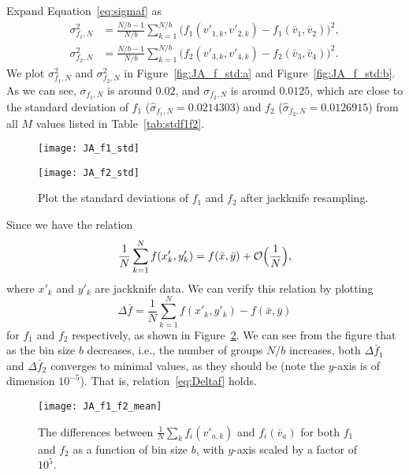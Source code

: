 \Answer{}
Expand Equation~\eqref{eq:sigmaf} as
%
\begin{align}
    \sigma^2_{f_1,N} & = \frac{ N/b - 1 }{ N/b }
    \sum_{k=1}^{N/b} \bigl( f_1(v'_{1,k}, v'_{2,k}) - f_1(\bar{v}_1, \bar{v}_2) \bigr)^2, \\
    \sigma^2_{f_2,N} & = \frac{ N/b - 1 }{ N/b }
    \sum_{k=1}^{N/b} \bigl( f_2(v'_{3,k}, v'_{4,k}) - f_2(\bar{v}_3, \bar{v}_4) \bigr)^2.
\end{align}
%
We plot \(\sigma^2_{f_1,N}\) and \(\sigma^2_{f_2,N}\) in Figure~\ref{fig:JA_f_std:a}
and Figure~\ref{fig:JA_f_std:b}.
As we can see, \(\sigma_{f_1,N}\) is around \(0.02\),
and \(\sigma_{f_2,N}\) is around \(0.0125\), which are close to the standard deviation
of \(f_1\) (\(\hat{\sigma}_{f_1,N} = 0.0214303\)) and
\(f_2\) (\(\hat{\sigma}_{f_2,N} = 0.0126915\))
from all \(M\) values listed in Table~\ref{tab:stdf1f2}.
%
\begin{figure}
    \centering
    \begin{minipage}[t]{0.8\linewidth}
        \centering
        \texttt{[image: JA\_f1\_std]}
        \label{fig:JA_f_std:a}
    \end{minipage}
    \hfill
    \begin{minipage}[t]{0.8\linewidth}
        \centering
        \texttt{[image: JA\_f2\_std]}
        \label{fig:JA_f_std:b}
    \end{minipage}
    \caption{Plot the standard deviations of \(f_1\) and \(f_2\) after jackknife resampling.}
    \label{fig:JA_f_std}
\end{figure}

Since we have the relation
%
\begin{equation}\label{eq:Deltaf}
    \frac{1}{N} \sum_{k=1}^N f(x'_k, y'_k) = f(\bar{x}, \bar{y}) +
    \mathcal{O}\Bigl(\frac{1}{N}\Bigr),
\end{equation}
%
where \(x'_k\) and \(y'_k\) are jackknife data.
We can verify this relation by plotting
%
\begin{equation}
    \Delta \bar{f} = \frac{1}{N} \sum_{k=1}^N f(x'_k, y'_k) - f(\bar{x}, \bar{y})
\end{equation}
%
for \(f_1\) and \(f_2\) respectively, as shown in Figure~\ref{fig:JA_f1_f2_mean}.
We can see from the figure that as the bin size \(b\) decreases, i.e., the number
of groups \(N / b\) increases, both \(\Delta \bar{f}_1\) and \(\Delta \bar{f}_2\)
converges to minimal values, as they should be (note the \(y\)-axis is of dimension
\(10^{-5}\)). That is, relation~\eqref{eq:Deltaf} holds.
%
\begin{figure}[H]
    \centering
    \texttt{[image: JA\_f1\_f2\_mean]}
    \caption{The differences between \(\frac{1}{N} \sum_{k} f_i(v'_{a,k})\)
    and \(f_i(\bar{v}_a)\) for both \(f_1\) and \(f_2\) as a function of bin size
    \(b\), with \(y\)-axis scaled by a factor of \(10^5\).}
    \label{fig:JA_f1_f2_mean}
\end{figure}
